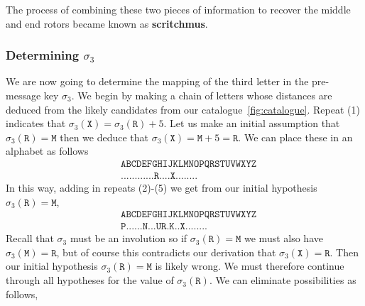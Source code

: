   The process of combining these two pieces of information to recover
  the middle and end rotors became known as {\bf{scritchmus}}.

  \subsubsection{Determining $\sigma_3$}
  We are now going to determine the mapping of the third letter in
  the pre-message key $\sigma_3$. We begin by making a chain of
  letters whose distances are deduced from the likely candidates from
  our catalogue~\ref{fig:catalogue}. Repeat (1) indicates that
  $\sigma_3(\texttt{X}) = \sigma_3(\texttt{R}) + 5$. Let us make an
  initial assumption that $\sigma_3(\texttt{R}) = \texttt{M}$ then we
  deduce that $\sigma_3(\texttt{X}) = \texttt{M} + 5 = \texttt{R}$.
  We can place these in an alphabet as follows
  \begin{align*}
    & \texttt{ABCDEFGHIJKLMNOPQRSTUVWXYZ} \\
    & \texttt{............R....X........}
  \end{align*}
  In this way, adding in repeats (2)-(5) we get from our initial
  hypothesis $\sigma_3(\texttt{R}) = \texttt{M}$,
  \begin{align*}
    & \texttt{ABCDEFGHIJKLMNOPQRSTUVWXYZ} \\
    & \texttt{P......N...UR.K..X........}
  \end{align*}
  Recall that $\sigma_3$ must be an involution so if
  $\sigma_3(\texttt{R}) = \texttt{M}$ we must also have
  $\sigma_3(\texttt{M}) = \texttt{R}$, but of course this contradicts
  our derivation that $\sigma_3(\texttt{X}) = \texttt{R}$. Then our
  initial hypothesis $\sigma_3(\texttt{R}) = \texttt{M}$ is likely
  wrong. We must therefore continue through all hypotheses for the
  value of $\sigma_3(\texttt{R})$. We can eliminate possibilities as follows,
